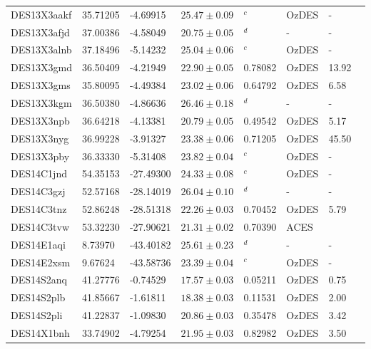 \documentclass[fleqn,usenatbib,]{mnras}
\begin{document}
\begin{table}
\begin{threeparttable}
\begin{tabular}{llllllll}
DES13X3aakf    & 35.71205 &  -4.69915 & $25.47 \pm 0.09$ &    $^c$ &      OzDES &             - \\
DES13X3afjd    & 37.00386 &  -4.58049 & $20.75 \pm 0.05$ &    $^d$ &          - &             - \\
DES13X3alnb    & 37.18496 &  -5.14232 & $25.04 \pm 0.06$ &    $^c$ &      OzDES &             - \\
DES13X3gmd\tnote{e}     & 36.50409 &  -4.21949 & $22.90 \pm 0.05$ & 0.78082 &      OzDES &      13.92 \\
DES13X3gms     & 35.80095 &  -4.49384 & $23.02 \pm 0.06$ & 0.64792 &      OzDES &       6.58 \\
DES13X3kgm     & 36.50380 &  -4.86636 & $26.46 \pm 0.18$ &    $^d$ &          - &             - \\
DES13X3npb     & 36.64218 &  -4.13381 & $20.79 \pm 0.05$ & 0.49542 &      OzDES &       5.17 \\
DES13X3nyg     & 36.99228 &  -3.91327 & $23.38 \pm 0.06$ & 0.71205 &      OzDES &      45.50 \\
DES13X3pby     & 36.33330 &  -5.31408 & $23.82 \pm 0.04$ &    $^c$ &      OzDES &             - \\
DES14C1jnd     & 54.35153 & -27.49300 & $24.33 \pm 0.08$ &    $^c$ &      OzDES &             - \\
DES14C3gzj\tnote{e}     & 52.57168 & -28.14019 & $26.04 \pm 0.10$ &    $^d$ &          - &             - \\
DES14C3tnz\tnote{e}     & 52.86248 & -28.51318 & $22.26 \pm 0.03$ & 0.70452 &      OzDES &       5.79 \\
DES14C3tvw     & 53.32230 & -27.90621 & $21.31 \pm 0.02$ & 0.70390 &       ACES &               \\
DES14E1aqi\tnote{e}     &  8.73970 & -43.40182 & $25.61 \pm 0.23$ &    $^d$ &          - &             - \\
DES14E2xsm     &  9.67624 & -43.58736 & $23.39 \pm 0.04$ &    $^c$ &      OzDES &             - \\
DES14S2anq     & 41.27776 &  -0.74529 & $17.57 \pm 0.03$ & 0.05211 &      OzDES &       0.75 \\
DES14S2plb     & 41.85667 &  -1.61811 & $18.38 \pm 0.03$ & 0.11531 &      OzDES &       2.00 \\
DES14S2pli     & 41.22837 &  -1.09830 & $20.86 \pm 0.03$ & 0.35478 &      OzDES &       3.42 \\
DES14X1bnh     & 33.74902 &  -4.79254 & $21.95 \pm 0.03$ & 0.82982 &      OzDES &       3.50 \\

\end{tabular}
\end{threeparttable}
\end{table}
\end{document}
